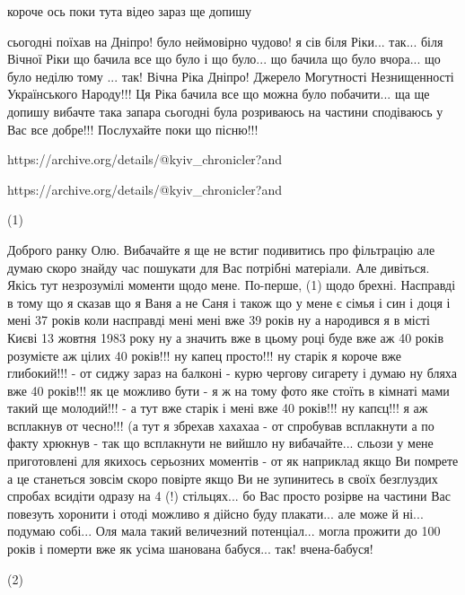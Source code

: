 короче ось поки тута відео зараз ще допишу

сьогодні поїхав на Дніпро! було неймовірно чудово! я сів біля Ріки...
так... біля Вічної Ріки що бачила все що було і що було...
що бачила що було вчора... що було неділю тому ...
так! Вічна Ріка Дніпро! Джерело Могутності Незнищенності Українського Народу!!!
Ця Ріка бачила все що можна було побачити... ща ще допишу вибачте така запара сьогодні 
була розриваюсь на частини сподіваюсь у Вас все добре!!! Послухайте поки що пісню!!! 

https://archive.org/details/@kyiv_chronicler?and%

https://archive.org/details/@kyiv_chronicler?and%

(1)

Доброго ранку Олю. Вибачайте я ще не встиг подивитись про фільтрацію але думаю
скоро знайду час пошукати для Вас потрібні матеріали. Але дивіться. Якісь тут
незрозумілі моменти щодо мене.  По-перше, (1) щодо брехні. Насправді в тому що
я сказав що я Ваня а не Саня і також що у мене є сімья і син і доця і мені 37
років коли насправді мені мені вже 39 років ну а народився я в місті Києві 13
жовтня 1983 року ну а значить вже в цьому році буде вже аж 40 років розумієте
аж цілих 40 років!!! ну капец просто!!!  ну старік я короче вже глибокий!!! -
от сиджу зараз на балконі - курю чергову сигарету і думаю ну бляха вже 40
років!!!  як це можливо бути - я ж на тому фото яке стоїть в кімнаті мами такий
ще молодий!!! - а тут вже старік і мені вже 40 років!!! ну капєц!!!  я аж
всплакнув от чесно!!! (а тут я збрехав хахахаа - от спробував всплакнути а по
факту хрюкнув - так що всплакнути не вийшло ну вибачайте... сльози у мене
приготовлені для якихось серьозних моментів - от як наприклад якщо Ви помрете а
це станеться зовсім скоро повірте якщо Ви не зупинитесь в своїх безглуздих
спробах всидіти одразу на 4 (!) стільцях... бо Вас просто розірве на частини
Вас повезуть хоронити і отоді можливо я дійсно буду плакати... але може й ні...
подумаю собі...  Оля мала такий величезний потенціал... могла прожити до 100
років і померти вже як усіма шанована бабуся... так! вчена-бабуся!

(2)

